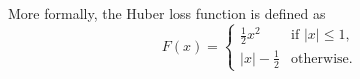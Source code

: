 More formally, the Huber loss function is defined as
\begin{equation}
  F(x) = \begin{cases}
           \frac{1}{2} x^2 & \text{if $|x| \leq 1$},\\
           |x| - \frac{1}{2} & \text{otherwise}.
         \end{cases}
\end{equation}
